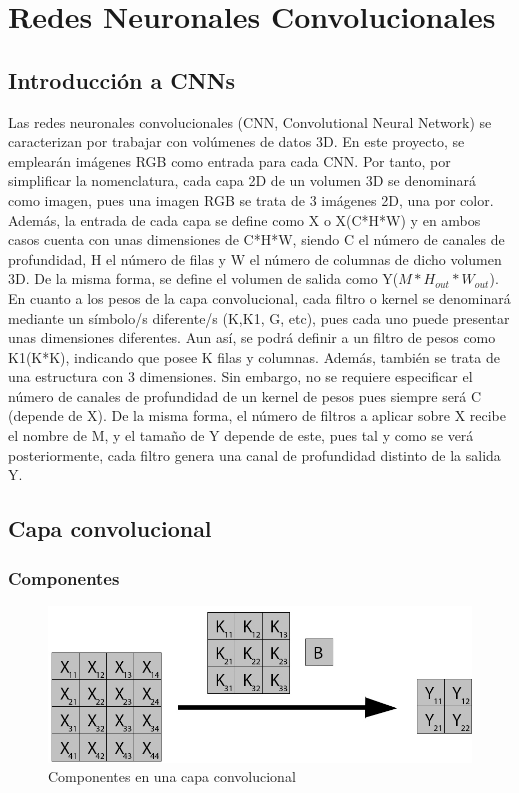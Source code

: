 \section{Redes Neuronales Convolucionales}

\subsection{Introducción a CNNs}

Las redes neuronales convolucionales (CNN, Convolutional Neural Network) se caracterizan por trabajar con volúmenes de datos 3D. En este proyecto, se emplearán imágenes RGB como entrada para cada CNN. Por tanto, por simplificar la nomenclatura, cada capa 2D de un volumen 3D se denominará como imagen, pues una imagen RGB se trata de 3 imágenes 2D, una por color. Además, la entrada de cada capa se define como X o X(C*H*W) y en ambos casos cuenta con unas dimensiones de C*H*W, siendo C el número de canales de profundidad, H el número de filas y W el número de columnas de dicho volumen 3D. De la misma forma, se define el volumen de salida como Y($M*H_{out}*W_{out}$). En cuanto a los pesos de la capa convolucional, cada filtro o kernel se denominará mediante un símbolo/s diferente/s (K,K1, G, etc), pues cada uno puede presentar unas dimensiones diferentes. Aun así, se podrá definir a un filtro de pesos como K1(K*K), indicando que posee K filas y columnas. Además, también se trata de una estructura con 3 dimensiones. Sin embargo, no se requiere especificar el número de canales de profundidad de un kernel de pesos pues siempre será C (depende de X). De la misma forma, el número de filtros a aplicar sobre X recibe el nombre de M, y el tamaño de Y depende de este, pues tal y como se verá posteriormente, cada filtro genera una canal de profundidad distinto de la salida Y. 

\subsection{Capa convolucional}

\subsubsection{Componentes}


\begin{figure}[H]
	\centering
	\includegraphics[scale=0.35]{imagenes/conv_nombres.jpg}  
	\caption{Componentes en una capa convolucional}
	\label{fig:Componentes_convolucion}
\end{figure}

